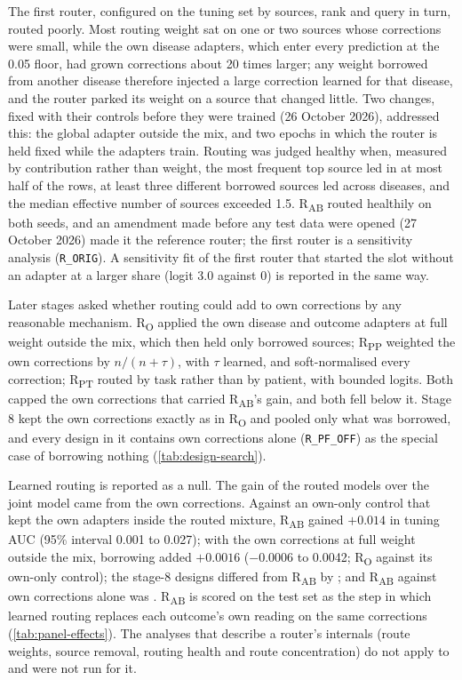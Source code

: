 The first router, configured on the tuning set by sources, rank and query in
turn, routed poorly. Most routing weight sat on one or two sources whose
corrections were small, while the own disease adapters, which enter every
prediction at the 0.05 floor, had grown corrections about 20 times larger; any
weight borrowed from another disease therefore injected a large correction
learned for that disease, and the router parked its weight on a source that
changed little. Two changes, fixed with their controls before they were trained
(26 October 2026), addressed this: the global adapter outside the mix, and two
epochs in which the router is held fixed while the adapters train. Routing was
judged healthy when, measured by contribution rather than weight, the most
frequent top source led in at most half of the rows, at least three different
borrowed sources led across diseases, and the median effective number of
sources exceeded 1.5. R\textsubscript{AB} routed healthily on both seeds, and an
amendment made before any test data were opened (27 October 2026) made it the
reference router; the first router is a sensitivity analysis
(\texttt{R\_ORIG}). A sensitivity fit of the first router that started the slot
without an adapter at a larger share (logit 3.0 against 0) is reported in the
same way.

Later stages asked whether routing could add to own corrections by any
reasonable mechanism. R\textsubscript{O} applied the own disease and outcome
adapters at full weight outside the mix, which then held only borrowed sources;
R\textsubscript{PP} weighted the own corrections by $n/(n+\tau)$, with $\tau$
learned, and soft-normalised every correction; R\textsubscript{PT} routed by
task rather than by patient, with bounded logits. Both capped the own
corrections that carried R\textsubscript{AB}'s gain, and both fell below it.
Stage 8 kept the own corrections exactly as in
R\textsubscript{O} and pooled only what was borrowed, and every design in it
contains own corrections alone (\texttt{R\_PF\_OFF}) as the special case of
borrowing nothing (\cref{tab:design-search}).

Learned routing is reported as a null. The gain of the routed models over the
joint model came from the own corrections. Against an own-only control that
kept the own adapters inside the routed mixture, R\textsubscript{AB} gained
$+0.014$ in tuning AUC (95\% interval 0.001 to 0.027); with the own corrections
at full weight outside the mix, borrowing added $+0.0016$ ($-0.0006$ to 0.0042;
R\textsubscript{O} against its own-only control); the stage-8 designs differed
from R\textsubscript{AB} by ; and R\textsubscript{AB} against
own corrections alone was .
R\textsubscript{AB} is scored
on the test set as the step in which learned routing replaces each outcome's own
reading on the same corrections (\cref{tab:panel-effects}). The analyses that
describe a router's internals (route weights, source removal, routing health and
route concentration) do not apply to \opera{} and were not run for it.

